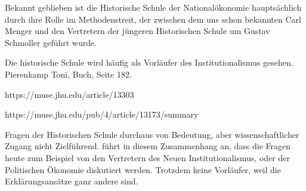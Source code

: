 Bekannt geblieben ist die Historische Schule der Nationalökonomie hauptsächlich durch ihre Rolle im Methodenstreit, der zwischen dem uns schon bekannten Carl Menger und den Vertretern der jüngeren Historischen Schule um Gustav Schmoller geführt wurde.



Die historische Schule wird häufig als Vorläufer des Institutionalismus gesehen.
Pierenkamp Toni, Buch, Seite 182.


https://muse.jhu.edu/article/13303


https://muse.jhu.edu/pub/4/article/13173/summary




Fragen der Historischen Schule durchaus von Bedeutung, aber wissenschaftlicher Zugang nicht Zielführend. \textcite[S. 210]{Rosner2012} führt in diesem Zusammenhang an, dass die Fragen heute zum Beispiel von den Vertretern des Neuen Institutionalismus, oder der Politischen Ökonomie diskutiert werden. Trotzdem keine Vorläufer, weil die Erklärungsansätze ganz andere sind.


